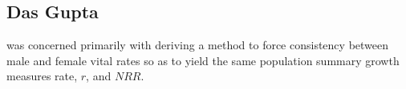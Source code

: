 
\subsection{Das Gupta}

\citet{gupta1972two, das1973growth,gupta1976interactive, gupta1978alternative}
was concerned primarily with deriving a method to force consistency between male and female
vital rates so as to yield the same population summary growth measures rate,
$r$, and $NRR$.

